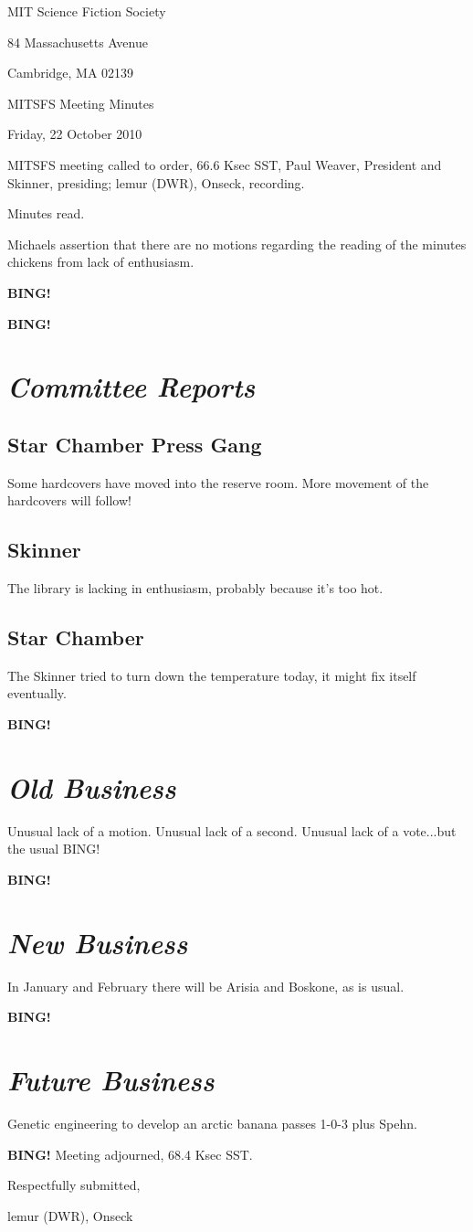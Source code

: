 \documentclass[10pt]{article}
\newcommand{\bing}{{\bf BING!} }
\newcommand{\goto}[1]{\bing \vskip 12pt \section*{{\em{#1}}}}
\newcommand{\ps}{ plus Spehn\xspace}
\newcommand{\skinner}{Paul Weaver, President and Skinner}
\newcommand{\onseck}{lemur (DWR), Onseck}
\newcommand{\meetingdate}{Friday, 22 October 2010}
\begin{document}
\begin{center}

MIT Science Fiction Society

84 Massachusetts Avenue

Cambridge, MA 02139

\vspace{12pt}

MITSFS Meeting Minutes

\meetingdate

\end{center}

\vspace{18pt}

\setlength{\parskip}{6pt}

\noindent
MITSFS meeting called to order, 66.6 Ksec SST,
\skinner, presiding; \onseck, recording.

Minutes read.

Michaels assertion that there are no motions regarding the 
reading of the minutes chickens from lack of enthusiasm.

\bing

\goto{Committee Reports}

\subsection*{Star Chamber Press Gang}

Some hardcovers have moved into the reserve room.  More movement of
the hardcovers will follow! 

\subsection*{Skinner}

The library is lacking in enthusiasm, probably because it's too hot.

\subsection*{Star Chamber}

The Skinner tried to turn down the temperature today, it might fix
itself eventually.

\goto{Old Business}

Unusual lack of a motion.  Unusual lack of a second.  Unusual lack of a
vote...but the usual BING!

\goto{New Business}

In January and February there will be Arisia and Boskone, as is usual.

\goto{Future Business}

Genetic engineering to develop an arctic banana passes 1-0-3\ps.

\bing
\noindent
Meeting adjourned, 68.4 Ksec SST.

\vspace{18pt}

\centerline{Respectfully submitted,}
\centerline{\onseck}
\end{document}
